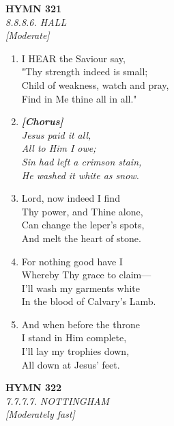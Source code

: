 \documentclass[11pt,a4paper]{article}
\begin{document}
\newpage
\begin{center}
    {\Large \textbf{HYMN 321}}
    \\
    \textit{8.8.8.6. HALL}
    \\
    \textit{\small [Moderate]}
\end{center}
\vspace{1em}

\begin{enumerate}
    \item I HEAR the Saviour say, \\
        "Thy strength indeed is small; \\
        Child of weakness, watch and pray, \\
        Find in Me thine all in all."

    \item[] \vspace{0.4em}
    \textbf{\textit{[Chorus]}} \\
    \textit{Jesus paid it all,} \\
    \textit{All to Him I owe;} \\
    \textit{Sin had left a crimson stain,} \\
    \textit{He washed it white as snow.}
    \vspace{0.4em}

    \item Lord, now indeed I find \\
        Thy power, and Thine alone, \\
        Can change the leper's spots, \\
        And melt the heart of stone.

    \item For nothing good have I \\
        Whereby Thy grace to claim--- \\
        I'll wash my garments white \\
        In the blood of Calvary's Lamb.

    \item And when before the throne \\
        I stand in Him complete, \\
        I'll lay my trophies down, \\
        All down at Jesus' feet.

\end{enumerate}

\newpage
\begin{center}
    {\Large \textbf{HYMN 322}}
    \\
    \textit{7.7.7.7. NOTTINGHAM}
    \\
    \textit{\small [Moderately fast]}
\end{center}
\vspace{1em}
\end{document}

